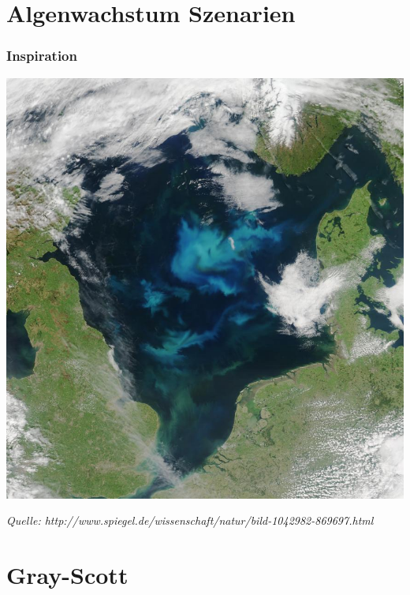 \documentclass[12pt]{beamer}
\begin{document}
    \section{Algenwachstum Szenarien}
    
    \begin{frame}
    \begin{center}
    \frametitle{Inspiration}
    \includegraphics[scale=0.15]{Bilder/seaweed.jpg}
    
    {\tiny \textit{Quelle: http://www.spiegel.de/wissenschaft/natur/bild-1042982-869697.html}}
    \end{center}
    \end{frame}
    

    \section{Gray-Scott}
    
\end{document}
